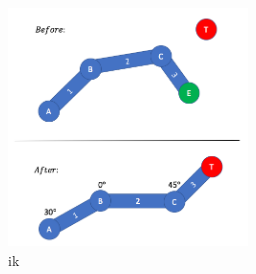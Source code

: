 \documentclass[../../main.tex]{subfiles}
\begin{document}
\begin{figure} 
  \centering \includegraphics[width = 2.5in]{chapters/background_work/images/inverse_kinematics_example.png} 
  \caption{\gls{ik}} 
  \label{fig:inverse_kinematics_example} 
\end{figure}
\end{document}

